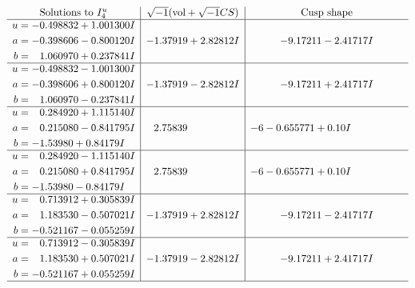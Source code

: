 \documentclass[1p]{elsarticle_modified}
\theoremstyle{definition}
\newcommand{\I}{\sqrt{-1}}
\begin{document}
$$\begin{array}{c|c|c}  
\text{Solutions to }I^u_{4}& \I (\text{vol} + \sqrt{-1}CS) & \text{Cusp shape}\\
 \hline 
\begin{aligned}
u &= -0.498832 + 1.001300 I \\
a &= -0.398606 - 0.800120 I \\
b &= \phantom{-}1.060970 + 0.237841 I\end{aligned}
 & -1.37919 + 2.82812 I & -9.17211 - 2.41717 I \\ \hline\begin{aligned}
u &= -0.498832 - 1.001300 I \\
a &= -0.398606 + 0.800120 I \\
b &= \phantom{-}1.060970 - 0.237841 I\end{aligned}
 & -1.37919 - 2.82812 I & -9.17211 + 2.41717 I \\ \hline\begin{aligned}
u &= \phantom{-}0.284920 + 1.115140 I \\
a &= \phantom{-}0.215080 - 0.841795 I \\
b &= -1.53980 + 0.84179 I\end{aligned}
 & \phantom{-}2.75839\phantom{ +0.000000I} &                  -6
-0.655771 + 0. 10   I\phantom{ +0.000000I} \\ \hline\begin{aligned}
u &= \phantom{-}0.284920 - 1.115140 I \\
a &= \phantom{-}0.215080 + 0.841795 I \\
b &= -1.53980 - 0.84179 I\end{aligned}
 & \phantom{-}2.75839\phantom{ +0.000000I} &                  -6
-0.655771 + 0. 10   I\phantom{ +0.000000I} \\ \hline\begin{aligned}
u &= \phantom{-}0.713912 + 0.305839 I \\
a &= \phantom{-}1.183530 - 0.507021 I \\
b &= -0.521167 - 0.055259 I\end{aligned}
 & -1.37919 + 2.82812 I & -9.17211 - 2.41717 I \\ \hline\begin{aligned}
u &= \phantom{-}0.713912 - 0.305839 I \\
a &= \phantom{-}1.183530 + 0.507021 I \\
b &= -0.521167 + 0.055259 I\end{aligned}
 & -1.37919 - 2.82812 I & -9.17211 + 2.41717 I\\
 \hline 
 \end{array}$$\newpage
\end{document}
